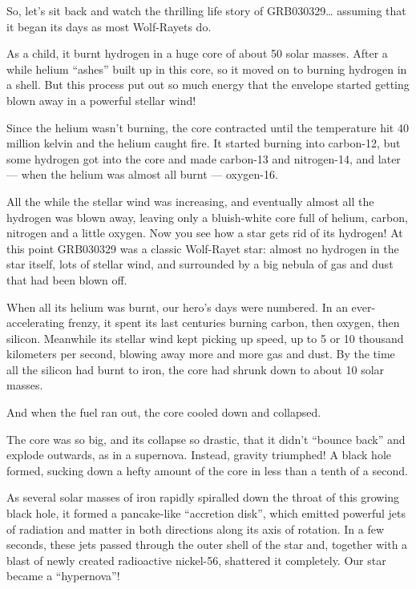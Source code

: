 \documentclass{article}
\begin{document}
So, let's sit back and watch the thrilling life story of
GRB030329\ldots{} assuming that it began its days as most Wolf-Rayets
do.

As a child, it burnt hydrogen in a huge core of about 50 solar masses.
After a while helium ``ashes'' built up in this core, so it moved on to
burning hydrogen in a shell. But this process put out so much energy
that the envelope started getting blown away in a powerful stellar wind!

Since the helium wasn't burning, the core contracted until the
temperature hit 40 million kelvin and the helium caught fire. It started
burning into carbon-12, but some hydrogen got into the core and made
carbon-13 and nitrogen-14, and later --- when the helium was almost all
burnt --- oxygen-16.

All the while the stellar wind was increasing, and eventually almost all
the hydrogen was blown away, leaving only a bluish-white core full of
helium, carbon, nitrogen and a little oxygen. Now you see how a star
gets rid of its hydrogen! At this point GRB030329 was a classic
Wolf-Rayet star: almost no hydrogen in the star itself, lots of stellar
wind, and surrounded by a big nebula of gas and dust that had been blown
off.

When all its helium was burnt, our hero's days were numbered. In an
ever-accelerating frenzy, it spent its last centuries burning carbon,
then oxygen, then silicon. Meanwhile its stellar wind kept picking up
speed, up to 5 or 10 thousand kilometers per second, blowing away more
and more gas and dust. By the time all the silicon had burnt to iron,
the core had shrunk down to about 10 solar masses.

And when the fuel ran out, the core cooled down and collapsed.

The core was so big, and its collapse so drastic, that it didn't
``bounce back'' and explode outwards, as in a supernova. Instead,
gravity triumphed! A black hole formed, sucking down a hefty amount of
the core in less than a tenth of a second.

As several solar masses of iron rapidly spiralled down the throat of
this growing black hole, it formed a pancake-like ``accretion disk'',
which emitted powerful jets of radiation and matter in both directions
along its axis of rotation. In a few seconds, these jets passed through
the outer shell of the star and, together with a blast of newly created
radioactive nickel-56, shattered it completely. Our star became a
``hypernova''!
\end{document}
